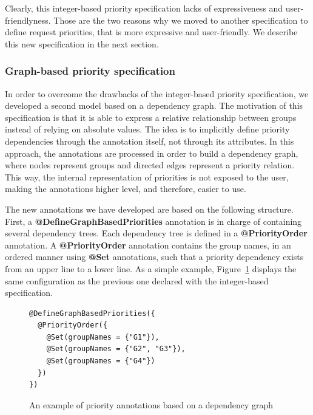 \documentclass[11pt]{report}
\begin{document}
Clearly, this integer-based priority specification lacks of expressiveness and user-friendlyness. Those are the two reasons why we moved to another specification to define request priorities, that is more expressive and user-friendly. We describe this new specification in the next section.
 
\subsubsection{Graph-based priority specification}
In order to overcome the drawbacks of the integer-based priority specification, we developed a second model based on a dependency graph. The motivation of this specification is that it is able to express a relative relationship between groups instead of relying on absolute values. The idea is to implicitly define priority dependencies through the annotation itself, not through its attributes. In this approach, the annotations are processed in order to build a dependency graph, where nodes represent groups and directed edges represent a priority relation. This way, the internal representation of priorities is not exposed to the user, making the annotations higher level, and therefore, easier to use.

The new annotations we have developed are based on the following structure. First, a \textbf{@DefineGraphBasedPriorities} annotation is in charge of containing several dependency trees. Each dependency tree is defined in a \textbf{@PriorityOrder} annotation. A \textbf{@PriorityOrder} annotation contains the group names, in an ordered manner using \textbf{@Set} annotations, such that a priority dependency exists from an upper line to a lower line. As a simple example, Figure~\ref{graph_priority_annotation} displays the same configuration as the previous one declared with the integer-based specification.

\begin{figure}[!ht]
	\lstset{language=java, numbers=left, numberstyle=\tiny, stepnumber=1, numbersep=5pt, basicstyle=\footnotesize}
	\begin{lstlisting}[frame=single]
@DefineGraphBasedPriorities({
  @PriorityOrder({
    @Set(groupNames = {"G1"}),
    @Set(groupNames = {"G2", "G3"}),
    @Set(groupNames = {"G4"})
  })
})
 	\end{lstlisting}
\caption{An example of priority annotations based on a dependency graph}
\label{graph_priority_annotation}
\end{figure}
\end{document}
